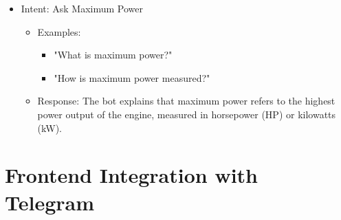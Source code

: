 \documentclass[a4paper,12pt]{article}
\begin{document}
\begin{itemize}
	\item Intent: Ask Maximum Power
	\begin{itemize}
		\item Examples:
		\begin{itemize}
			\item "What is maximum power?"
			\item "How is maximum power measured?"
		\end{itemize}
		\item Response: The bot explains that maximum power refers to the highest power output of the engine, measured in horsepower (HP) or kilowatts (kW).
	\end{itemize}
\end{itemize}


\section{Frontend Integration with Telegram}
\end{document}
